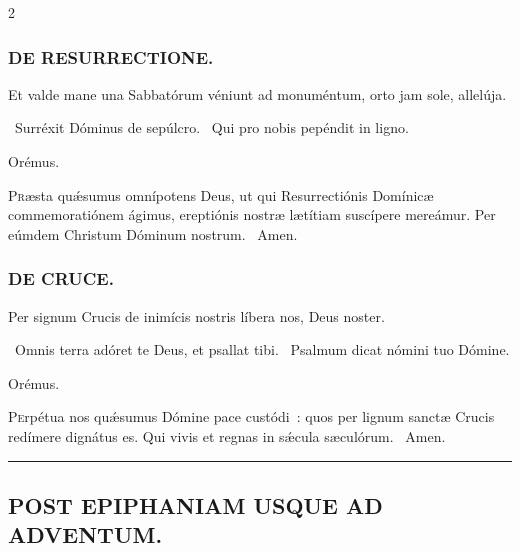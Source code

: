 \documentclass[9pt,twoside]{extarticle}
\begin{document}
\begin{multicols}{2}
{\subsubsection*{\center \textsc{DE RESURRECTIONE.}}
\begin{tightlist}{}
\item {}
\item {} Et valde mane una Sabbatórum véniunt ad monuméntum, orto jam sole, allelúja.
\item {}~Surréxit Dóminus de sepúlcro. ~Qui pro nobis pepéndit in ligno.
\item Orémus. \hfill {}
\end{tightlist}
\lettrine{P}ræsta quǽsumus omnípotens Deus, ut qui Resurrectiónis Domínicæ commemoratiónem ágimus, ereptiónis nostræ lætítiam suscípere mereámur. Per eúmdem Christum Dóminum nostrum. ~Amen.

\subsubsection*{\center \textsc{DE CRUCE.}}
\begin{tightlist}{}
\item {}
\item {} Per signum Crucis de inimícis nostris líbera nos, Deus noster.
\item {}~Omnis terra adóret te Deus, et psallat tibi. ~Psalmum dicat nómini tuo Dómine.
\item Orémus. \hfill {}
\end{tightlist}
\lettrine{P}erpétua nos quǽsumus Dómine pace custódi~: quos per lignum sanctæ Crucis redímere dignátus es. Qui vivis et regnas in sǽcula sæculórum. ~Amen.

\begin{center}\textcolor{red}{\rule{\linewidth}{0.5pt}} \end{center}

\subsection*{\center \textsc{POST EPIPHANIAM USQUE AD ADVENTUM.}}
\begin{tightlist}{}
\item {}
\end{tightlist}

}
\end{multicols}
\end{document}
